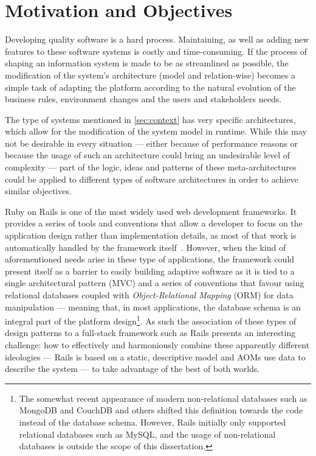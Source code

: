 \section{Motivation and Objectives}\label{sec:goals}

Developing quality software is a hard process. Maintaining, as well as adding new features to these software systems is costly and time-consuming. If the process of shaping an information system is made to be as streamlined as possible, the modification of the system's architecture (model and relation-wise) becomes a simple task of adapting the platform according to the natural evolution of the business rules, environment changes and the users and stakeholders needs.

The type of systems mentioned in \ref{sec:context} has very specific architectures, which allow for the modification of the system model in runtime. While this may not be desirable in every situation --- either because of performance reasons or because the usage of such an architecture could bring an undesirable level of complexity --- part of the logic, ideas and patterns of these meta-architectures could be applied to different types of software architectures in order to achieve similar objectives.

Ruby on Rails is one of the most widely used web development frameworks. It provides a series of tools and conventions that allow a developer to focus on the application design rather than implementation details, as most of that work is automatically handled by the framework itself~\cite{rails_quotes}. However, when the kind of aforementioned needs arise in these type of applications, the framework could present itself as a barrier to easily building adaptive software as it is tied to a single architectural pattern (MVC) and a series of conventions that favour using relational databases coupled with \emph{Object-Relational Mapping} (ORM) for data manipulation --- meaning that, in most applications, the database schema is an integral part of the platform design\footnote{The somewhat recent appearance of modern non-relational databases such as MongoDB and CouchDB and others shifted this definition towards the code instead of the database schema. However, Rails initially only supported relational databases such as MySQL, and the usage of non-relational databases is outside the scope of this dissertation.}. As such the association of these types of design patterns to a full-stack framework such as Rails presents an interesting challenge: how to effectively and harmoniously combine these apparently different ideologies --- Rails is based on a static, descriptive model and AOMs use data to describe the system --- to take advantage of the best of both worlds.

